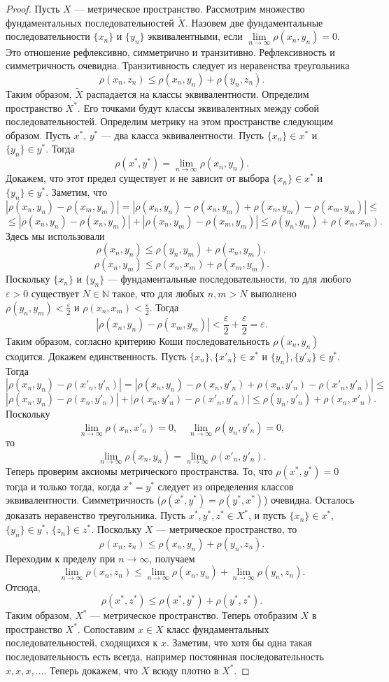 \documentclass[12pt, titlepage, oneside]{amsbook}
\newcommand{\NN}{\mathbb{N}}
\theoremstyle{definition}
\theoremstyle{remark}
\begin{document}
\begin{proof}
	Пусть $X$ --- метрическое пространство. Рассмотрим множество фундаментальных последовательностей $\tilde{X}$. Назовем две фундаментальные последовательности $\{x_n\}$ и $\{y_n\}$ эквивалентными, если $\lim\limits_{n\rightarrow\infty}\rho(x_n,y_n)=0$. Это отношение рефлексивно, симметрично и транзитивно. Рефлексивность и симметричность очевидна. Транзитивность следует из неравенства треугольника $$\rho(x_n,z_n)\leq \rho(x_n,y_n)+\rho(y_n,z_n).$$ Таким образом, $\tilde{X}$ распадается на классы эквивалентности. Определим пространство $X^*$. Его точками будут классы эквивалентных между собой последовательностей. Определим метрику на этом пространстве следующим образом. Пусть $x^*$, $y^*$ --- два класса эквивалентности. Пусть $\{x_n\}\in x^*$ и $\{y_n\}\in y^*$. Тогда $$\rho(x^*,y^*)=\lim\limits_{n\rightarrow\infty}\rho(x_n,y_n).$$ Докажем, что этот предел существует и не зависит от выбора $\{x_n\}\in x^*$ и $\{y_n\}\in y^*$. Заметим, что $$|\rho(x_n,y_n)-\rho(x_m,y_m)|=|\rho(x_n,y_n)-\rho(x_n,y_m)+\rho(x_n,y_m)-\rho(x_m,y_m)|\leq$$ $$\leq|\rho(x_n,y_n)-\rho(x_n,y_m)|+|\rho(x_n,y_m)-\rho(x_m,y_m)|\leq\rho(y_n,y_m)+\rho(x_n,x_m).$$ Здесь мы использовали $$\rho(x_n,y_n)\leq\rho(y_n,y_m)+\rho(x_n,y_m),$$ $$\rho(x_n,y_m)\leq\rho(x_n,x_m)+\rho(x_m,y_m).$$ Поскольку $\{x_n\}$ и $\{y_n\}$ --- фундаментальные последовательности, то для любого $\varepsilon>0$ существует $N\in\NN$ такое, что для любых $n,m>N$ выполнено $\rho(y_n,y_m)<\frac{\varepsilon}{2}$ и $\rho(x_n,x_m)<\frac{\varepsilon}{2}$. Тогда $$|\rho(x_n,y_n)-\rho(x_m,y_m)|<\frac{\varepsilon}{2}+\frac{\varepsilon}{2}=\varepsilon.$$ Таким образом, согласно критерию Коши последовательность $\rho(x_n,y_n)$ сходится. Докажем единственность. Пусть $\{x_n\},\{x'_n\}\in x^*$ и $\{y_n\},\{y'_n\}\in y^*$. Тогда $$|\rho(x_n,y_n)-\rho(x'_n,y'_n)|=|\rho(x_n,y_n)-\rho(x_n,y'_n)+\rho(x_n,y'_n)-\rho(x'_n,y'_n)|\leq$$ $$|\rho(x_n,y_n)-\rho(x_n,y'_n)|+|\rho(x_n,y'_n)-\rho(x'_n,y'_n)|\leq\rho(y_n,y'_n)+\rho(x_n,x'_n).$$ Поскольку $$\lim\limits_{n\rightarrow\infty}\rho(x_n,x'_n)=0,\quad\lim\limits_{n\rightarrow\infty}\rho(y_n,y'_n)=0,$$ то $$\lim\limits_{n\rightarrow\infty}\rho(x_n,y_n)=\lim\limits_{n\rightarrow\infty}\rho(x'_n,y'_n).$$ Теперь проверим аксиомы метрического пространства. То, что $\rho(x^*,y^*)=0$ тогда и только тогда, когда $x^*=y^*$ следует из определения классов эквивалентности. Симметричность ($\rho(x^*,y^*)=\rho(y^*,x^*)$) очевидна. Осталось доказать неравенство треугольника. Пусть $x^*,y^*,z^*\in X^*$, и пусть $\{x_n\}\in x^*$, $\{y_n\}\in y^*$, $\{z_n\}\in z^*$. Поскольку $X$ --- метрическое пространство, то $$\rho(x_n,z_n)\leq\rho(x_n,y_n)+\rho(y_n,z_n).$$ Переходим к пределу при $n\rightarrow\infty$, получаем $$\lim\limits_{n\rightarrow\infty}\rho(x_n,z_n)\leq\lim\limits_{n\rightarrow\infty}\rho(x_n,y_n)+\lim\limits_{n\rightarrow\infty}\rho(y_n,z_n).$$ Отсюда, $$\rho(x^*,z^*)\leq\rho(x^*,y^*)+\rho(y^*,z^*).$$ Таким образом, $X^*$ --- метрическое пространство. Теперь отобразим $X$ в пространство $X^*$. Сопоставим $x\in X$ класс фундаментальных последовательностей, сходящихся к $x$. Заметим, что хотя бы одна такая последовательность есть всегда, например постоянная последовательность $x,x,x,\ldots$. Теперь докажем, что $X$ всюду плотно в $X^*$. 
\end{proof}
\end{document}
